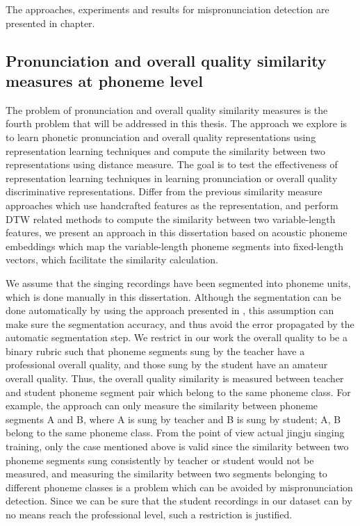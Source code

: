 The approaches, experiments and results for mispronunciation detection are presented in chapter.

\subsection{Pronunciation and overall quality similarity measures at phoneme level}\label{sec:ch3:similarity_formulation}

The problem of pronunciation and overall quality similarity measures is the fourth problem that will be addressed in this thesis. The approach we explore is to learn phonetic pronunciation and overall quality representations using representation learning techniques and compute the similarity between two representations using distance measure. The goal is to test the effectiveness of representation learning techniques in learning pronunciation or overall quality discriminative representations. Differ from the previous similarity measure approaches which use handcrafted features as the representation, and perform DTW related methods to compute the similarity between two variable-length features, we present an approach in this dissertation based on acoustic phoneme embeddings which map the variable-length phoneme segments into fixed-length vectors, which facilitate the similarity calculation.

We assume that the singing recordings have been segmented into phoneme units, which is done manually in this dissertation. Although the segmentation can be done automatically by using the approach presented in , this assumption can make sure the segmentation accuracy, and thus avoid the error propagated by the automatic segmentation step. We restrict in our work the overall quality to be a binary rubric such that phoneme segments sung by the teacher have a professional overall quality, and those sung by the student have an amateur overall quality. Thus, the overall quality similarity is measured between teacher and student phoneme segment pair which belong to the same phoneme class. For example, the approach can only measure the similarity between phoneme segments A and B, where A is sung by teacher and B is sung by student; A, B belong to the same phoneme class. From the point of view actual jingju singing training, only the case mentioned above is valid since the similarity between two phoneme segments sung consistently by teacher or student would not be measured, and measuring the similarity between two segments belonging to different phoneme classes is a problem which can be avoided by mispronunciation detection. Since we can be sure that the student recordings in our dataset can by no means reach the professional level, such a restriction is justified.

